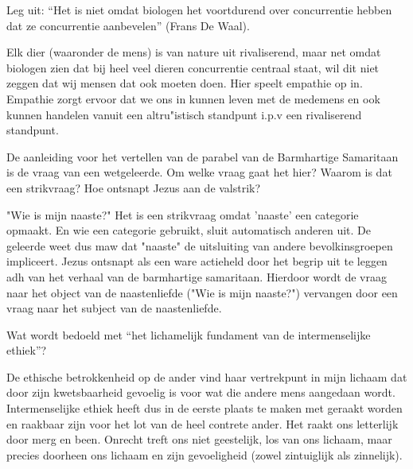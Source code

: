 \documentclass[main.tex]{subfiles}
\begin{document}
\begin{examenvraag}
    \begin{vraag}
        Leg uit: “Het is niet omdat biologen het voortdurend over concurrentie hebben dat ze concurrentie aanbevelen” (Frans De Waal).
    \end{vraag}

    \begin{antwoord}
	    Elk dier (waaronder de mens) is van nature uit rivaliserend, maar net omdat biologen zien dat bij heel veel dieren concurrentie centraal staat, wil dit niet zeggen dat wij mensen dat ook moeten doen. Hier speelt empathie op in. Empathie zorgt ervoor dat we ons in kunnen leven met de medemens en ook kunnen handelen vanuit een altru"istisch standpunt i.p.v een rivaliserend standpunt.
    \end{antwoord}
\end{examenvraag}


\begin{examenvraag}
    \begin{vraag}
        De aanleiding voor het vertellen van de parabel van de Barmhartige Samaritaan is de vraag van een wetgeleerde. Om welke vraag gaat het hier? Waarom is dat een strikvraag? Hoe ontsnapt Jezus aan de valstrik?
    \end{vraag}

    \begin{antwoord}
		"Wie is mijn naaste?" 
		Het is een strikvraag omdat 'naaste' een categorie opmaakt. 
		En wie een categorie gebruikt, sluit automatisch anderen uit.
		De geleerde weet dus maw dat "naaste" de uitsluiting van andere bevolkinsgroepen impliceert.
		Jezus ontsnapt als een ware actieheld door het begrip uit te leggen adh van het verhaal van de barmhartige samaritaan.
		Hierdoor wordt de vraag naar het object van de naastenliefde ("Wie is mijn naaste?")  vervangen door een vraag naar het subject van de naastenliefde.
		
		    
    
    \end{antwoord}
\end{examenvraag}


\begin{examenvraag}
    \begin{vraag}
        Wat wordt bedoeld met “het lichamelijk fundament van de intermenselijke ethiek”?
    \end{vraag}

    \begin{antwoord}
       De ethische betrokkenheid op de ander vind haar vertrekpunt in mijn lichaam dat door zijn 
       kwetsbaarheid gevoelig is voor wat die andere mens aangedaan wordt.‭ ‬Intermenselijke ethiek 
       heeft dus in de eerste plaats te maken met geraakt worden en raakbaar‭ ‬zijn voor het lot van 
       de heel contrete ander.‭ ‬Het raakt ons letterlijk door merg en been.‭ ‬Onrecht treft ons niet 
       geestelijk,‭ ‬los van ons lichaam,‭ ‬maar precies doorheen ons lichaam en zijn gevoeligheid‭ 
       (‬zowel zintuiglijk als zinnelijk‭)‬.

    \end{antwoord}
\end{examenvraag}
\end{document}
